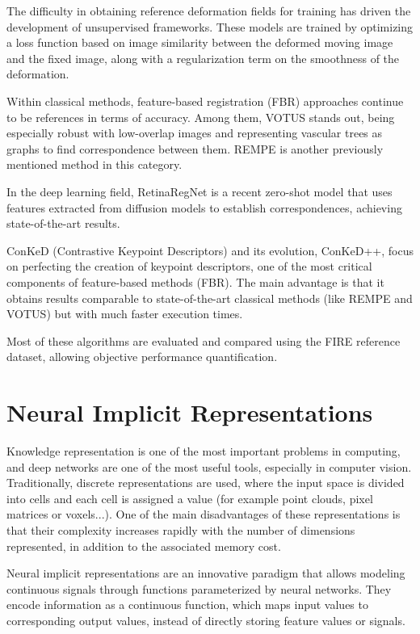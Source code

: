 The difficulty in obtaining reference deformation fields for training has driven the development of unsupervised frameworks. These models are trained by optimizing a loss function based on image similarity between the deformed moving image and the fixed image, along with a regularization term on the smoothness of the deformation.

Within classical methods, feature-based registration (FBR) approaches continue to be references in terms of accuracy. Among them, VOTUS \cite{Votus} stands out, being especially robust with low-overlap images and representing vascular trees as graphs to find correspondence between them. REMPE \cite{rempe} is another previously mentioned method in this category.

In the deep learning field, RetinaRegNet \cite{sivaraman2024retinaregnetzeroshotapproachretinal} is a recent zero-shot model that uses features extracted from diffusion models to establish correspondences, achieving state-of-the-art results.

ConKeD (Contrastive Keypoint Descriptors) and its evolution, ConKeD++, focus on perfecting the creation of keypoint descriptors, one of the most critical components of feature-based methods (FBR).
The main advantage is that it obtains results comparable to state-of-the-art classical methods (like REMPE and VOTUS) but with much faster execution times.

Most of these algorithms are evaluated and compared using the FIRE \cite{FIRE} reference dataset, allowing objective performance quantification.

\section{Neural Implicit Representations}
\label{sec:Representación Neuronais Implícitas}

Knowledge representation is one of the most important problems in computing, and deep networks are one of the most useful tools, especially in computer vision.
Traditionally, discrete representations are used, where the input space is divided into cells and each cell is assigned a value (for example point clouds, pixel matrices or voxels...).
One of the main disadvantages of these representations is that their complexity increases rapidly with the number of dimensions represented, in addition to the associated memory cost.

Neural implicit representations are an innovative paradigm that allows modeling continuous signals through functions parameterized by neural networks.
They encode information as a continuous function, which maps input values to corresponding output values, instead of directly storing feature values or signals.

